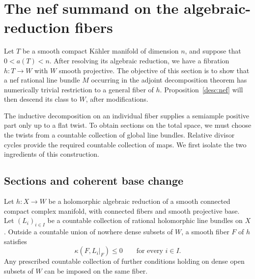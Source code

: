 \section{The nef summand on the algebraic-reduction fibers}
\label{sec:cycles}

Let $T$ be a smooth compact K\"ahler manifold of dimension $n$, and suppose
that $0<a(T)<n$.  After resolving its algebraic reduction, we have a
fibration $h:T\to W$ with $W$ smooth projective.  The objective of this
section is to show that a nef rational line bundle $M$ occurring in the
adjoint decomposition theorem has numerically trivial restriction to a
general fiber of $h$.  Proposition~\ref{desc:nef} will then descend its
class to $W$, after modifications.

The inductive decomposition on an individual fiber supplies a semiample
positive part only up to a flat twist.  To obtain sections on the total
space, we must choose the twists from a countable collection of global
line bundles.  Relative divisor cycles provide the required countable
collection of maps.  We first isolate the two ingredients of this
construction.

\subsection{Sections and coherent base change}

\begin{lemma}\label{cycle:sections}
Let $h:X\to W$ be a holomorphic algebraic reduction of a smooth connected
compact complex manifold, with connected fibers and smooth projective
base.  Let $(L_i)_{i\in I}$ be a countable collection of rational
holomorphic line bundles on $X$.  Outside a countable union of nowhere
dense subsets of $W$, a smooth fiber $F$ of $h$ satisfies
\[
                         \kappa(F,L_i|_F)\leq 0
                         \qquad\text{for every }i\in I.
\]
Any prescribed countable collection of further conditions holding on
dense open subsets of $W$ can be imposed on the same fiber.
\end{lemma}


